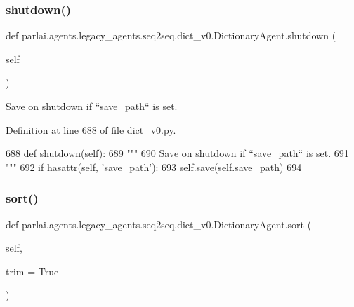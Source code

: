 \subsubsection{\texorpdfstring{shutdown()}{shutdown()}}
{\footnotesize\ttfamily def parlai.\+agents.\+legacy\+\_\+agents.\+seq2seq.\+dict\+\_\+v0.\+Dictionary\+Agent.\+shutdown (\begin{DoxyParamCaption}\item[{}]{self }\end{DoxyParamCaption})}

\begin{DoxyVerb}Save on shutdown if ``save_path`` is set.
\end{DoxyVerb}
 

Definition at line 688 of file dict\+\_\+v0.\+py.


\begin{DoxyCode}
688     \textcolor{keyword}{def }shutdown(self):
689         \textcolor{stringliteral}{"""}
690 \textcolor{stringliteral}{        Save on shutdown if ``save\_path`` is set.}
691 \textcolor{stringliteral}{        """}
692         \textcolor{keywordflow}{if} hasattr(self, \textcolor{stringliteral}{'save\_path'}):
693             self.save(self.save\_path)
694 
\end{DoxyCode}
\mbox{\label{classparlai_1_1agents_1_1legacy__agents_1_1seq2seq_1_1dict__v0_1_1DictionaryAgent_a346cc45c8e6eba82cb76878445e843cf}} 
\subsubsection{\texorpdfstring{sort()}{sort()}}
{\footnotesize\ttfamily def parlai.\+agents.\+legacy\+\_\+agents.\+seq2seq.\+dict\+\_\+v0.\+Dictionary\+Agent.\+sort (\begin{DoxyParamCaption}\item[{}]{self,  }\item[{}]{trim = {\ttfamily True} }\end{DoxyParamCaption})}

